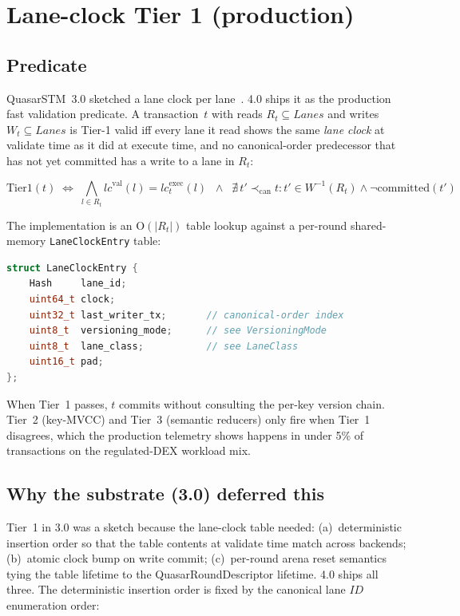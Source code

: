 \section{Lane-clock Tier 1 (production)}

\label{sec:tier1}

\subsection{Predicate}

QuasarSTM~3.0 sketched a lane clock per
lane~\cite{lp010-quasarstm-3}. 4.0 ships it as the production fast
validation predicate. A transaction~$t$ with reads
$R_t \subseteq \mathit{Lanes}$ and writes
$W_t \subseteq \mathit{Lanes}$ is Tier-1 valid iff every lane it read
shows the same \emph{lane clock} at validate time as it did at execute
time, and no canonical-order predecessor that has not yet committed
has a write to a lane in $R_t$:

\[
\mathrm{Tier1}(t) \;\Longleftrightarrow\;
\bigwedge_{l \in R_t} \mathit{lc}^{\mathrm{val}}(l) = \mathit{lc}^{\mathrm{exec}}_t(l)
\;\;\wedge\;\;
\nexists\, t' \prec_{\mathrm{can}} t : t' \in W^{-1}(R_t) \wedge \neg \mathrm{committed}(t')
\]

The implementation is an O$(|R_t|)$ table lookup against a per-round
shared-memory \texttt{LaneClockEntry} table:

\begin{lstlisting}[language=C++]
struct LaneClockEntry {
    Hash     lane_id;
    uint64_t clock;
    uint32_t last_writer_tx;       // canonical-order index
    uint8_t  versioning_mode;      // see VersioningMode
    uint8_t  lane_class;           // see LaneClass
    uint16_t pad;
};
\end{lstlisting}

When Tier~1 passes, $t$ commits without consulting the per-key version
chain. Tier~2 (key-MVCC) and Tier~3 (semantic reducers) only fire when
Tier~1 disagrees, which the production telemetry shows happens in
under 5\% of transactions on the regulated-DEX workload mix.

\subsection{Why the substrate (3.0) deferred this}

Tier~1 in 3.0 was a sketch because the lane-clock table needed:
(a)~deterministic insertion order so that the table contents at
validate time match across backends;
(b)~atomic clock bump on write commit;
(c)~per-round arena reset semantics tying the table lifetime to the
QuasarRoundDescriptor lifetime.
4.0 ships all three. The deterministic insertion order is fixed by the
canonical lane $\!ID$ enumeration order:

